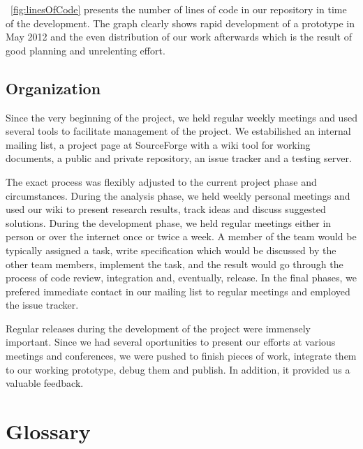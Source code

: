 \figurename~\ref{fig:linesOfCode} presents the number of lines of code in our repository in time of the development. The graph clearly shows rapid development of a prototype in May 2012 and the even distribution of our work afterwards which is the result of good planning and unrelenting effort.

\section*{Organization}
Since the very beginning of the project, we held regular weekly meetings and used several tools to facilitate management of the project. We estabilished an internal mailing list, a project page at SourceForge with a wiki tool for working documents, a public and private repository, an issue tracker and a testing server.

The exact process was flexibly adjusted to the current project phase and circumstances. During the analysis phase,  we held weekly personal meetings and used our wiki to present research results, track ideas and discuss suggested solutions. During the development phase, we held regular meetings either in person or over the internet once or twice a week. A member of the team would be typically assigned a task, write specification which would be discussed by the other team members, implement the task, and the result would go through the process of code review, integration and, eventually, release. In the final phases, we prefered immediate contact in our mailing list to regular meetings and employed the issue tracker.

Regular releases during the development of the project were immensely important. Since we had several oportunities to present our efforts at various meetings and conferences, we were pushed to finish pieces of work, integrate them to our working prototype, debug them and publish. In addition, it provided us a valuable feedback.

\chapter{Glossary}
\label{chap:glossary}



